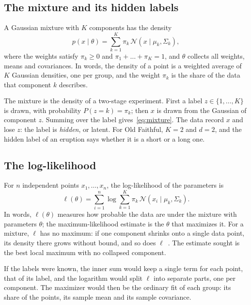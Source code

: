 \documentclass[11pt,a4paper]{amsart}
\numberwithin{equation}{section}
\theoremstyle{plain}
\theoremstyle{definition}
\theoremstyle{remark}
\newcommand{\N}{\mathcal{N}}
\newcommand{\given}{\mid}
\begin{document}
\subsection{The mixture and its hidden labels}\label{sec:mixture}

A Gaussian mixture with $K$ components has the density
\begin{equation}\label{eq:mixture}
  p(x \given \theta) = \sum_{k=1}^{K} \pi_k\, \N(x \given \mu_k, \Sigma_k),
\end{equation}
where the weights satisfy $\pi_k \geq 0$ and
$\pi_1 + \dots + \pi_K = 1$, and $\theta$ collects all weights, means
and covariances. In words, the density of a point is a weighted average
of $K$ Gaussian densities, one per group, and the weight $\pi_k$ is the
share of the data that component $k$ describes.

The mixture is the density of a two-stage experiment. First a label
$z \in \{1, \dots, K\}$ is drawn, with probability $P(z = k) = \pi_k$;
then $x$ is drawn from the Gaussian of component $z$. Summing over the
label gives~\eqref{eq:mixture}. The data record $x$ and lose $z$: the
label is \emph{hidden}, or latent. For Old Faithful, $K = 2$ and
$d = 2$, and the hidden label of an eruption says whether it is a short
or a long one.

\subsection{The log-likelihood}\label{sec:loglik}

For $n$ independent points $x_1, \dots, x_n$, the log-likelihood of the
parameters is
\begin{equation}\label{eq:loglik}
  \ell(\theta) = \sum_{i=1}^{n} \log \sum_{k=1}^{K}
    \pi_k\, \N(x_i \given \mu_k, \Sigma_k).
\end{equation}
In words, $\ell(\theta)$ measures how probable the data are under the
mixture with parameters $\theta$; the maximum-likelihood estimate is the
$\theta$ that maximizes it. For a mixture, $\ell$ has no maximum: if one
component shrinks onto a single data point, its density there grows
without bound, and so does $\ell$~\cite[Section~9.2]{bishop2006}. The
estimate sought is the best local maximum with no collapsed component.

If the labels were known, the inner sum would keep a single term for
each point, that of its label, and the logarithm would split $\ell$ into
separate parts, one per component. The maximizer would then be the
ordinary fit of each group: its share of the points, its sample mean and
its sample covariance.
\end{document}

